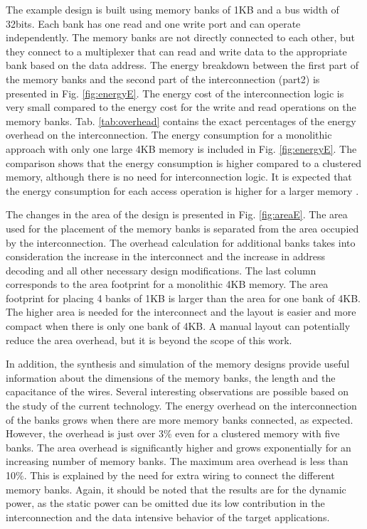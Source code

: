 The example design is built using memory banks of 1KB and a bus width of 32bits.
Each bank has one read and one write port and can operate independently.
The memory banks are not directly connected to each other, but they connect to a multiplexer that can read and write data to the appropriate bank based on the data address. 
The energy breakdown between the first part of the memory banks and the second part of the interconnection (part2) is presented in Fig. \ref{fig:energyE}.
The energy cost of the interconnection logic is very small compared to the energy cost for the write and read operations on the memory banks.
Tab. \ref{tab:overhead} contains the exact percentages of the energy overhead on the interconnection. 
The energy consumption for a monolithic approach with only one large 4KB memory is included in Fig. \ref{fig:energyE}.
The comparison shows that the energy consumption is higher compared to a clustered memory, although there is no need for interconnection logic.
It is expected that the energy consumption for each access operation is higher for a larger memory \cite{steinke2002assigning}.
 
The changes in the area of the design is presented in Fig. \ref{fig:areaE}.
The area used for the placement of the memory banks is separated from the area occupied by the interconnection.
The overhead calculation for additional banks takes into consideration the increase in the interconnect and the increase in address decoding and all other necessary design modifications.
The last column corresponds to the area footprint for a monolithic 4KB memory.
The area footprint for placing 4 banks of 1KB is larger than the area for one bank of 4KB.
The higher area is needed for the interconnect and the layout is easier and more compact when there is only one bank of 4KB.
A manual layout can potentially reduce the area overhead, but it is beyond the scope of this work.

In addition, the synthesis and simulation of the memory designs provide useful information about the dimensions of the memory banks, the length and the capacitance of the wires.
Several interesting observations are possible based on the study of the current technology.
The energy overhead on the interconnection of the banks grows when there are more memory banks connected, as expected.
However, the overhead is just over 3\% even for a clustered memory with five banks. 
The area overhead is significantly higher and grows exponentially for an increasing number of memory banks.  
The maximum area overhead is less than 10\%.
This is explained by the need for extra wiring to connect the different memory banks.
Again, it should be noted that the results are for the dynamic power, as the static power can be omitted due its low contribution in the interconnection and the data intensive behavior of the target applications.

